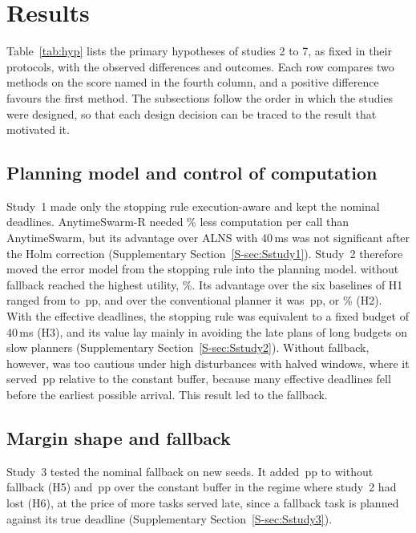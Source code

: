 \section{Results}\label{sec:results}
Table~\ref{tab:hyp} lists the primary hypotheses of studies 2 to 7, as fixed in their protocols, with the observed
differences and outcomes. Each row compares two methods on the score named in the fourth column, and a positive
difference favours the first method. The subsections follow the order in which the studies were designed, so that each
design decision can be traced to the result that motivated it.


\subsection{Planning model and control of computation}\label{sec:study1}\label{sec:study2}
Study~1 made only the stopping rule execution-aware and kept the nominal deadlines. AnytimeSwarm-R needed
\% less computation per call than AnytimeSwarm, but its advantage over ALNS with 40\,ms was not
significant after the Holm correction (Supplementary Section~\ref{S-sec:Sstudy1}). Study~2 therefore moved the error
model from the stopping rule into the planning model. \mname{} without fallback reached the highest utility,
\%. Its advantage over the six baselines of H1 ranged from  to \,pp, and over the
conventional planner it was \,pp, or \% (H2). With the effective deadlines, the stopping
rule was equivalent to a fixed budget of 40\,ms (H3), and its value lay mainly in avoiding the late plans of long
budgets on slow planners (Supplementary Section~\ref{S-sec:Sstudy2}). Without fallback, however, \mname{} was too
cautious under high disturbances with halved windows, where it served \,pp relative to the constant
buffer, because many effective deadlines fell before the earliest possible arrival. This result led to the fallback.

\subsection{Margin shape and fallback}\label{sec:study3}\label{sec:study4}
Study~3 tested the nominal fallback on new seeds. It added \,pp to \mname{} without fallback (H5) and
\,pp over the constant buffer in the regime where study~2 had lost (H6), at the price of more tasks
served late, since a fallback task is planned against its true deadline (Supplementary Section~\ref{S-sec:Sstudy3}).

